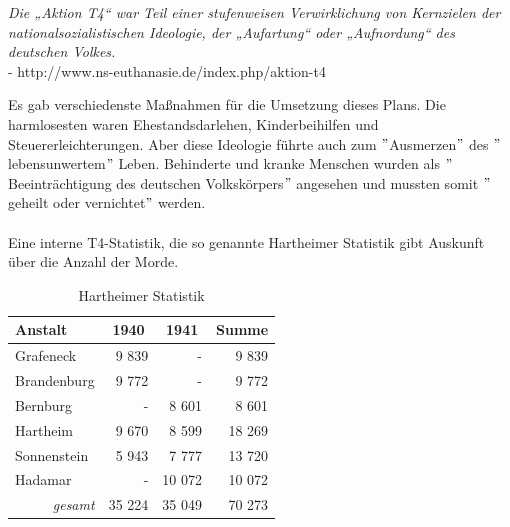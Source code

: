 \documentclass[a4paper, ngerman]{article}
\begin{document}
\begin{center}
    \textit{
        Die „Aktion T4“ war Teil einer stufenweisen Verwirklichung von Kernzielen der nationalsozialistischen Ideologie, der „Aufartung“ oder „Aufnordung“ des deutschen Volkes.
    }
    \\ - http://www.ns-euthanasie.de/index.php/aktion-t4
\end{center}

\noindent
Es gab verschiedenste Maßnahmen für die Umsetzung dieses Plans. Die harmlosesten waren Ehestandsdarlehen, Kinderbeihilfen
und Steuererleichterungen. Aber diese Ideologie führte auch zum $"$Ausmerzen$"$ des $"$lebensunwertem$"$ Leben. Behinderte und
kranke Menschen wurden als $"$Beeinträchtigung des deutschen Volkskörpers$"$ angesehen und mussten somit $"$geheilt oder
vernichtet$"$ werden.
\\ \\
Eine interne T4-Statistik, die so genannte Hartheimer Statistik gibt Auskunft über die Anzahl der Morde.
\begin{table}[h]
    \centering
    \caption{Hartheimer Statistik}
    \begin{tabular}{lrrr}
        \hline
        \textbf{Anstalt}                    & \multicolumn{1}{c}{\textbf{1940}} & \multicolumn{1}{c}{\textbf{1941}} & \multicolumn{1}{c}{\textbf{Summe}} \\ \hline
        Grafeneck                           & 9 839                             & -                                 & 9 839                              \\
        Brandenburg                         & 9 772                             & -                                 & 9 772                              \\
        Bernburg                            & -                                 & 8 601                             & 8 601                              \\
        Hartheim                            & 9 670                             & 8 599                             & 18 269                             \\
        Sonnenstein                         & 5 943                             & 7 777                             & 13 720                             \\
        Hadamar                             & -                                 & 10 072                            & 10 072                             \\ \hline
        \multicolumn{1}{r}{\textit{gesamt}} & 35 224                            & 35 049                            & 70 273                             \\ \hline
    \end{tabular}
\end{table}
\end{document}
